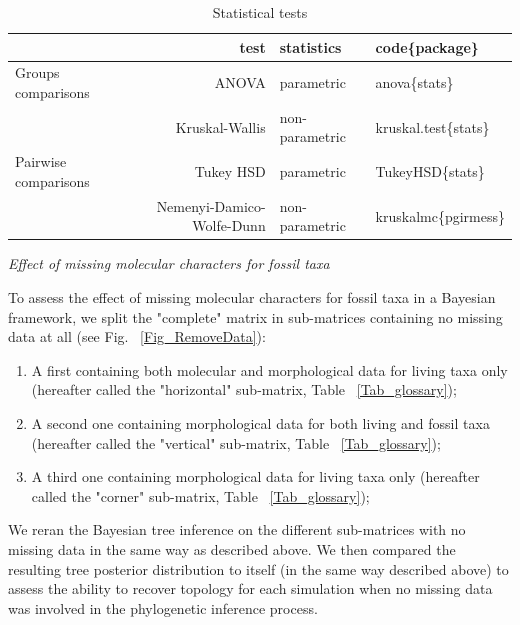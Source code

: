\documentclass[12pt,letterpaper]{article}
\renewcommand{\subsection}[1]{%
\bigskip
\begin{center}
\begin{large}
\normalfont\itshape #1
\end{large}
\end{center}}
\begin{document}
\begin{table}[ht]
\caption{Statistical tests}
\centering
\begin{tabular}{lrll}
  \hline
   & test & statistics & code\{package\} \\ [0.5ex]
  \hline
  Groups comparisons & ANOVA & parametric & anova\{stats\} \\ [0.5ex]
                     & Kruskal-Wallis & non-parametric & kruskal.test\{stats\} \\[0.5ex]
  \hline
  Pairwise comparisons & Tukey HSD & parametric & TukeyHSD\{stats\} \\ [0.5ex]
                       & Nemenyi-Damico-Wolfe-Dunn & non-parametric & kruskalmc\{pgirmess\} \\ [0.5ex]
  \hline
\end{tabular}
\label{Stats_test}
\end{table}

\subsection{Effect of missing molecular characters for fossil taxa} %
To assess the effect of missing molecular characters for fossil taxa in a Bayesian framework, we split the "complete" matrix in sub-matrices containing no missing data at all (see Fig. ~\ref{Fig_RemoveData}):
\begin{enumerate}
\item
A first containing both molecular and morphological data for living taxa only (hereafter called the "horizontal" sub-matrix, Table ~\ref{Tab_glossary});
\item
A second one containing morphological data for both living and fossil taxa (hereafter called the "vertical" sub-matrix, Table ~\ref{Tab_glossary});
\item
A third one containing morphological data for living taxa only (hereafter called the "corner" sub-matrix, Table ~\ref{Tab_glossary});
\end{enumerate}
We reran the Bayesian tree inference on the different sub-matrices with no missing data in the same way as described above.
We then compared the resulting tree posterior distribution to itself (in the same way described above) to assess the ability to recover topology for each simulation when no missing data was involved in the phylogenetic inference process.

\end{document}
